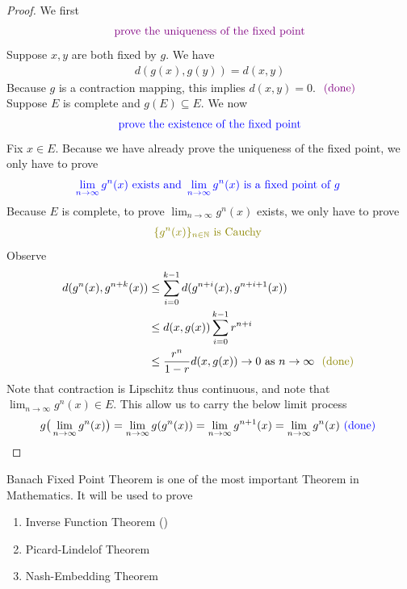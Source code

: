 \documentclass{report}
\begin{document}
\begin{proof}
We first 
\begin{align*}
\textcolor{violet}{\text{ prove the uniqueness of the fixed point }}
\end{align*}
Suppose $x,y$ are both fixed by $g$.  We have
\begin{align*}
d(g(x),g(y))=d(x,y)
\end{align*}
Because  $g$ is a contraction mapping,  this implies $d(x,y)=0$. $\textcolor{violet}{\text{ (done) }}$ \\

Suppose $E$ is complete and $g(E)\subseteq E$. We now 
\begin{align*}
\textcolor{blue}{\text{ prove the existence of the fixed point }}
\end{align*}
Fix $x \in E$. Because we have already prove the uniqueness of the fixed point, we only have to prove 
\begin{align*}
\textcolor{blue}{\lim_{n\to \infty}g^n(x)\text{ exists and }\lim_{n\to \infty}g^n(x)\text{ is a fixed point of $g$ }}
\end{align*}
Because $E$ is complete, to prove $\lim_{n\to \infty}g^n(x)$ exists, we only have to prove
\begin{align*}
\olive{\set{g^n(x)}_{n\inn}\text{ is Cauchy }}
\end{align*}
Observe 
\begin{align*}
  d(g^n(x),g^{n+k}(x))&\leq \sum_{i=0}^{k-1}d(g^{n+i}(x),g^{n+i+1}(x))\\
  &\leq d(x,g(x))\sum_{i=0}^{k-1}r^{n+i}\\
  &\leq \frac{r^n}{1-r}d(x,g(x))\to 0\text{ as $n\to \infty$ }\odone
\end{align*}
Note that contraction is Lipschitz thus continuous, and note that $\lim_{n\to \infty}g^n(x) \in E$. This allow us to carry the below limit process 
\begin{align*}
  g\big(\lim_{n\to \infty}g^n(x)\big)=\lim_{n\to \infty}g(g^n(x))=\lim_{n\to \infty}g^{n+1}(x)=\lim_{n\to \infty}g^n(x)\textcolor{blue}{\text{ (done) }}
\end{align*}
\end{proof}
\begin{mdframed}
Banach Fixed Point Theorem is one of the most important Theorem in Mathematics. It will be used to prove 
\begin{enumerate}[label=(\alph*)]
  \item Inverse Function Theorem () 
  \item Picard-Lindelof Theorem  
  \item Nash-Embedding Theorem
\end{enumerate}
\end{mdframed}
\end{document}
